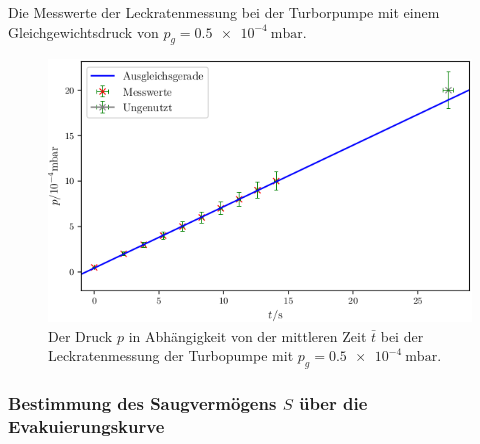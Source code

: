 \begin{table}
\centering
\caption{Die Messwerte der Leckratenmessung bei der Turborpumpe mit einem Gleichgewichtsdruck von $p_g = \SI{0.5e-4}{\milli\bar}$.}

\label{tab:TL4}
\end{table}

\begin{figure}
\centering
\includegraphics[width=\linewidth-70pt,height=\textheight-70pt,keepaspectratio]{content/images/TL4.png}
\caption{Der Druck $p$ in Abhängigkeit von der mittleren Zeit $\bar{t}$ bei der Leckratenmessung der Turbopumpe  mit $p_g = \SI{0.5e-4}{\milli\bar}$.}
\label{fig:TL4}
\end{figure}

\subsubsection{Bestimmung des Saugvermögens $S$ über die Evakuierungskurve}

